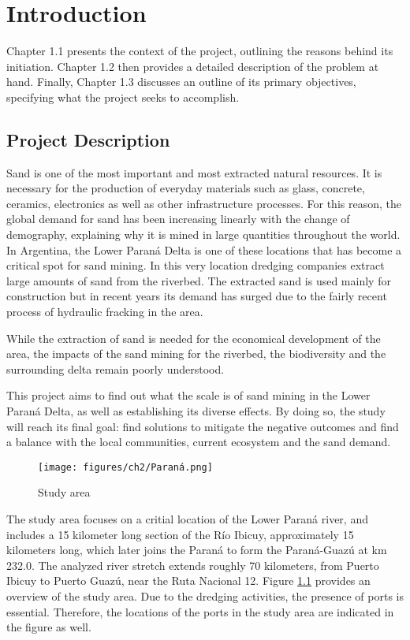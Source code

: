 \chapter{Introduction}
\label{chapter:introduction}

Chapter 1.1 presents the context of the project, outlining the reasons behind its initiation. Chapter 1.2 then provides a detailed description of the problem at hand. Finally, Chapter 1.3 discusses an outline of its primary objectives, specifying what the project seeks to accomplish.

\section{Project Description}
Sand is one of the most important and most extracted natural resources. It is necessary for the production of everyday materials such as glass, concrete, ceramics, electronics as well as other infrastructure processes. For this reason, the global demand for sand has been increasing linearly with the change of demography, explaining why it is mined in large quantities throughout the world. In Argentina, the Lower Paraná Delta is one of these locations that has become a critical spot for sand mining. In this very location dredging companies extract large amounts of sand from the riverbed. The extracted sand is used mainly for construction but in recent years its demand has surged due to the fairly recent process of hydraulic fracking in the area.



While the extraction of sand is needed for the economical development of the area, the impacts of the sand mining for the riverbed, the biodiversity and the surrounding delta remain poorly understood. 

This project aims to find out what the scale is of sand mining in the Lower Paraná Delta, as well as establishing its diverse effects. By doing so, the study will reach its final goal: find solutions to mitigate the negative outcomes and find a balance with the local communities, current ecosystem and the sand demand. 



\begin{figure}[H]
    \centering    \texttt{[image: figures/ch2/Paraná.png]}
    \caption{Study area}
    \label{fig:study area}
\end{figure}
\label{Figure 1.1}

The study area focuses on a critial location of the Lower Paraná river, and includes a 15 kilometer long section of the Río Ibicuy, approximately 15 kilometers long, which later joins the Paraná to form the Paraná-Guazú at km 232.0. The analyzed river stretch extends roughly 70 kilometers, from Puerto Ibicuy to Puerto Guazú, near the Ruta Nacional 12. Figure \ref{fig:study area} provides an overview of the study area. Due to the dredging activities, the presence of ports is essential. Therefore, the locations of the ports in the study area are indicated in the figure as well. 

